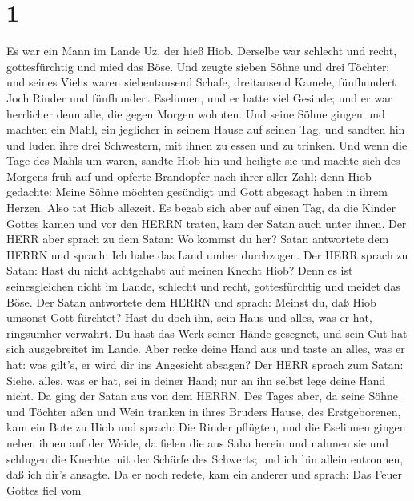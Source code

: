\hypertarget{section}{%
\section{1}\label{section}}

 Es war ein Mann im Lande Uz, der hieß Hiob. Derselbe war
schlecht und recht, gottesfürchtig und mied das Böse.  Und
zeugte sieben Söhne und drei Töchter;  und seines Viehs
waren siebentausend Schafe, dreitausend Kamele, fünfhundert Joch Rinder
und fünfhundert Eselinnen, und er hatte viel Gesinde; und er war
herrlicher denn alle, die gegen Morgen wohnten.  Und seine
Söhne gingen und machten ein Mahl, ein jeglicher in seinem Hause auf
seinen Tag, und sandten hin und luden ihre drei Schwestern, mit ihnen zu
essen und zu trinken.  Und wenn die Tage des Mahls um waren,
sandte Hiob hin und heiligte sie und machte sich des Morgens früh auf
und opferte Brandopfer nach ihrer aller Zahl; denn Hiob gedachte: Meine
Söhne möchten gesündigt und Gott abgesagt haben in ihrem Herzen. Also
tat Hiob allezeit.  Es begab sich aber auf einen Tag, da die
Kinder Gottes kamen und vor den HERRN traten, kam der Satan auch unter
ihnen.  Der HERR aber sprach zu dem Satan: Wo kommst du her?
Satan antwortete dem HERRN und sprach: Ich habe das Land umher
durchzogen.  Der HERR sprach zu Satan: Hast du nicht
achtgehabt auf meinen Knecht Hiob? Denn es ist seinesgleichen nicht im
Lande, schlecht und recht, gottesfürchtig und meidet das Böse.
 Der Satan antwortete dem HERRN und sprach: Meinst du, daß
Hiob umsonst Gott fürchtet?  Hast du doch ihn, sein Haus
und alles, was er hat, ringsumher verwahrt. Du hast das Werk seiner
Hände gesegnet, und sein Gut hat sich ausgebreitet im Lande.
 Aber recke deine Hand aus und taste an alles, was er hat:
was gilt's, er wird dir ins Angesicht absagen?  Der HERR
sprach zum Satan: Siehe, alles, was er hat, sei in deiner Hand; nur an
ihn selbst lege deine Hand nicht. Da ging der Satan aus von dem HERRN.
 Des Tages aber, da seine Söhne und Töchter aßen und Wein
tranken in ihres Bruders Hause, des Erstgeborenen,  kam ein
Bote zu Hiob und sprach: Die Rinder pflügten, und die Eselinnen gingen
neben ihnen auf der Weide,  da fielen die aus Saba herein
und nahmen sie und schlugen die Knechte mit der Schärfe des Schwerts;
und ich bin allein entronnen, daß ich dir's ansagte.  Da er
noch redete, kam ein anderer und sprach: Das Feuer Gottes fiel vom
